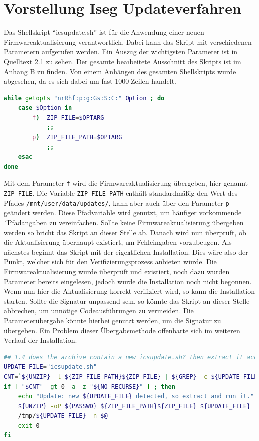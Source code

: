 \documentclass[thesis=bachelor,faculty=cb]{hsmw-thesis}
\begin{document}
\section{Vorstellung Iseg Updateverfahren}
Das Shellskript \enquote{icsupdate.sh} ist für die Anwendung einer neuen Firmwareaktualisierung verantwortlich. Dabei kann das Skript mit verschiedenen Parametern aufgerufen werden. Ein Auszug der wichtigsten Parameter ist in Quelltext 2.1 zu sehen. Der gesamte bearbeitete Ausschnitt des Skripts ist im Anhang B zu finden. Von einem Anhängen des gesamten Shellskripts wurde abgesehen, da es sich dabei um fast 1000 Zeilen handelt.
\begin{lstlisting}[language=bash, caption={Parameterübergabe icsupdate.sh}]
while getopts "nrRhf:p:g:Gs:S:C:" Option ; do
	case $Option in
		f)	ZIP_FILE=$OPTARG
			;;
		p)	ZIP_FILE_PATH=$OPTARG
			;;
	esac
done
\end{lstlisting} 
Mit dem Parameter \texttt{f} wird die Firmwareaktualisierung übergeben, hier genannt \texttt{ZIP\_FILE}. Die Variable \texttt{ZIP\_FILE\_PATH} enthält standardmäßig den Wert des Pfades \texttt{/mnt/user/data/updates/}, kann aber auch über den Parameter \texttt{p} geändert werden. Diese Pfadvariable wird genutzt, um häufiger vorkommende ´Pfadangaben zu vereinfachen.
Sollte keine Firmwareaktualisierung übergeben werden so bricht das Skript an dieser Stelle ab. Danach wird nun überprüft, ob die Aktualisierung überhaupt existiert, um Fehleingaben vorzubeugen. Als nächstes beginnt das Skript mit der eigentlichen Installation. Dies wäre also der Punkt, welcher sich für den Verifizierungsprozess anbieten würde. Die Firmwareaktualisierung wurde überprüft und existiert, noch dazu wurden Parameter bereits eingelesen, jedoch wurde die Installation noch nicht begonnen. Wenn nun hier die Aktualisierung korrekt verifiziert wird, so kann die Installation starten. Sollte die Signatur unpassend sein, so könnte das Skript an dieser Stelle abbrechen, um unnötige Codeausführungen zu vermeiden. Die Parameterübergabe könnte hierbei genutzt werden, um die Signatur zu übergeben. Ein Problem dieser Übergabemethode offenbarte sich im weiteren Verlauf der Installation.
\begin{lstlisting}[language=bash, caption={Überprüfung neues icsupdate.sh}]
## 1.4 does the archive contain a new icsupdate.sh? then extract it accordingly
UPDATE_FILE="icsupdate.sh"
CNT=`${UNZIP} -l ${ZIP_FILE_PATH}${ZIP_FILE} | ${GREP} -c ${UPDATE_FILE}`
if [ "$CNT" -gt 0 -a -z "${NO_RECURSE}" ] ; then
	echo "Update: new ${UPDATE_FILE} detected, so extract and run it."
	${UNZIP} -oP ${PASSWD} ${ZIP_FILE_PATH}${ZIP_FILE} ${UPDATE_FILE} -d /tmp || FAILURE=1
	/tmp/${UPDATE_FILE} -n $@
	exit 0
fi
\end{lstlisting}  
\end{document}
